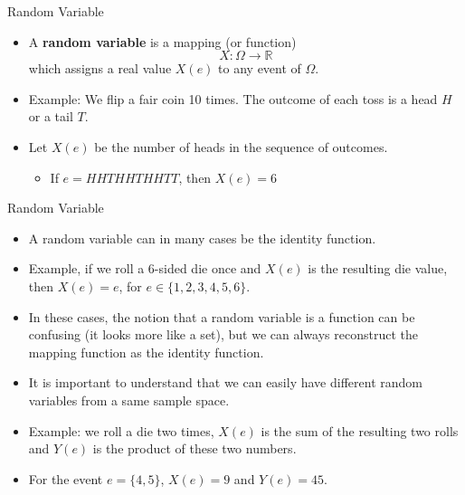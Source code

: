 \documentclass[handout]{beamer}
\begin{document}
\begin{frame}{Random Variable}
\scriptsize{

\begin{itemize}
 \item A \textbf{random variable} is a mapping (or function)
\begin{displaymath}
 X: \Omega \rightarrow \mathbb{R}
\end{displaymath}
which assigns a real value $X(e)$ to any event of $\Omega$.


\item Example: We flip a fair coin 10 times. The outcome of each toss is a head $H$ or a tail $T$.

\item  Let $X(e)$ be the number of heads in the sequence of outcomes.
\begin{itemize}
 \item If $e=HHTHHTHHTT$, then $X(e)=6$ 
\end{itemize}

\end{itemize}
}

\end{frame}


\begin{frame}{Random Variable}
\scriptsize{

\begin{itemize}
\item A random variable can in many cases be the identity function.

\item Example, if we roll a 6-sided die once and $X(e)$ is the resulting die value, then $X(e)=e$, for $e \in \{1,2,3,4,5,6\}$.

\item In these cases, the notion that a random variable is a function can be confusing (it looks more like a set), but we can always reconstruct the mapping function as the identity function.  

\item  It is important to understand that we can easily have different random variables from a same sample space. 

\item Example: we roll a die two times, $X(e)$ is the sum of the resulting two rolls and $Y(e)$ is the product of these two numbers.

\item For the event $e=\{4,5\}$, $X(e)=9$ and $Y(e)=45$.

\end{itemize}
}




\end{frame}
\end{document}
